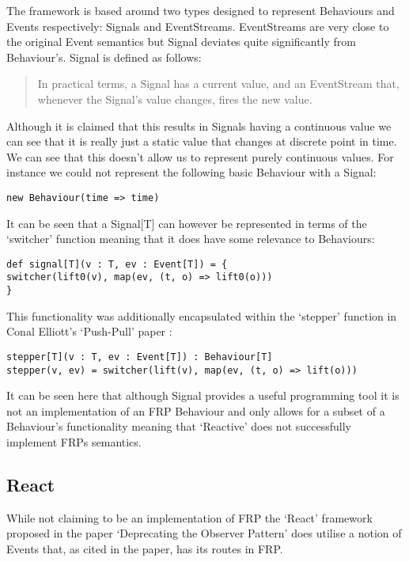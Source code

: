       The framework is based around two types designed to represent Behaviours and Events respectively: Signals
      and EventStreams. EventStreams are very close to the original Event semantics but Signal deviates quite significantly from 
      Behaviour's. Signal is defined as follows:

      \begin{quote}
        In practical terms, a Signal has a current value, and an EventStream that, whenever the Signal's value changes,     
        fires the new value.
      \end{quote}  

      Although it is claimed that this results in Signals having a continuous value we can see
      that it is really just a static value that changes at discrete point in
      time. We can see that this doesn't allow us to represent purely continuous values. For instance
      we could not represent the following basic Behaviour with a Signal:

\begin{verbatim}
new Behaviour(time => time)
\end{verbatim}

      It can be seen that a Signal[T] can however be represented in terms
      of the `switcher' function meaning that it does have some relevance to Behaviours:

\begin{verbatim}
def signal[T](v : T, ev : Event[T]) = {
switcher(lift0(v), map(ev, (t, o) => lift0(o)))
}
\end{verbatim}  

      This functionality was additionally encapsulated within the `stepper' function in Conal Elliott's
      `Push-Pull' paper \cite{Elliott2009}:

\begin{verbatim}
stepper[T](v : T, ev : Event[T]) : Behaviour[T]
stepper(v, ev) = switcher(lift(v), map(ev, (t, o) => lift(o)))
\end{verbatim} 

      It can be seen here that although Signal provides a useful programming tool it is not an implementation
      of an FRP Behaviour and only allows for a subset of a Behaviour's functionality meaning that `Reactive'
      does not successfully implement FRPs semantics.

    \subsection{React}
      While not claiming to be an implementation of FRP the `React' framework proposed in the 
      paper `Deprecating the Observer Pattern' \cite{Maier2010} does utilise a notion of Events that, as cited in the paper,
      has its routes in FRP.

